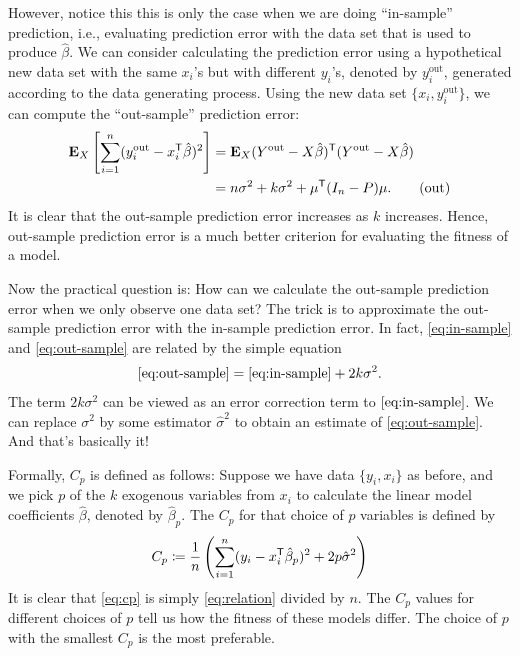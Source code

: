 \documentclass[a4paper,12pt]{article}
\begin{document}
However, notice this this is only the case when we are doing ``in-sample'' prediction, i.e.,
evaluating prediction error with the data set that is used to produce $\hat\beta$.
We can consider calculating the prediction error using a hypothetical new data set with the same $x_{i}$'s but with different $y_{i}$'s,
denoted by $y_{i}^{\text{out}}$, generated according to the data generating process.
Using the new data set $\{x_{i},y_{i}^{\text{out}}\}$, we can compute the ``out-sample'' prediction error:
\begin{align}\label{eq:out-sample}
	\operatorname{\text{\textrm{\upshape\textbf{E}}}}_{X} \left[ \sum_{i=1}^{n} ( y_{i}^{\text{out}} - x_{i}^{\mathsf{T}}\hat\beta )^{2} \right]
	&= \operatorname{\text{\textrm{\upshape\textbf{E}}}}_{X} (Y^{\text{out}}-X\hat\beta)^{\mathsf{T}}(Y^{\text{out}}-X\hat\beta) \nonumber\\
	&= n\sigma^{2} + k\sigma^{2} + \mu^{\mathsf{T}}(I_n-P)\mu. \tag{out}
\end{align}
It is clear that the out-sample prediction error increases as $k$ increases.
Hence, out-sample prediction error is a much better criterion for evaluating the fitness of a model.

Now the practical question is: How can we calculate the out-sample prediction error when we only observe one data set?
The trick is to approximate the out-sample prediction error with the in-sample prediction error.
In fact, \eqref{eq:in-sample} and \eqref{eq:out-sample} are related by the simple equation
\begin{align}\label{eq:relation}
	\eqref{eq:out-sample} = \eqref{eq:in-sample} + 2k\sigma^2.
\end{align}
The term $2k\sigma^2$ can be viewed as an error correction term to $\eqref{eq:in-sample}$.
We can replace $\sigma^{2}$ by some estimator $\hat\sigma^{2}$ to obtain an estimate of \eqref{eq:out-sample}.
And that's basically it!

Formally, $C_{p}$ is defined as follows:
Suppose we have data $\{y_{i},x_{i}\}$ as before,
and we pick $p$ of the $k$ exogenous variables from $x_{i}$ to calculate the linear model coefficients $\hat\beta$, denoted by $\hat\beta_{p}$.
The $C_{p}$ for that choice of $p$ variables is defined by
\begin{align}\label{eq:cp}
	C_{p} \coloneqq 
	\frac1n\left( \sum_{i=1}^{n} (y_{i}-x_{i}^{\mathsf{T}}\hat\beta_{p})^{2} + 2p\hat\sigma^{2} \right)
\end{align}
It is clear that \eqref{eq:cp} is simply \eqref{eq:relation} divided by $n$.
The $C_{p}$ values for different choices of $p$ tell us how the fitness of these models differ.
The choice of $p$ with the smallest $C_{p}$ is the most preferable.
\end{document}
